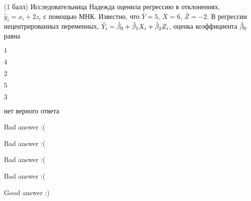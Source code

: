 
\begin{question}
(1 балл) Исследовательница Надежда оценила регрессию в отклонениях,
\(\hat y_i = x_i + 2 z_i\) с помощью МНК. Известно, что \(\bar Y=5\),
\(\bar X =6\), \(\bar Z=-2\). В регрессии нецентрированных переменных,
\(\hat Y_i = \hat{\beta}_0 + \hat{\beta}_1 X_i + \hat{\beta}_2 Z_i\), оценка коэффициента
\(\hat{\beta}_0\) равна
\begin{answerlist}
  \item \(1\)
  \item \(4\)
  \item \(2\)
  \item \(5\)
  \item \(3\)
  \item нет верного ответа
\end{answerlist}
\end{question}

\begin{solution}
\begin{answerlist}
  \item Bad answer :(
  \item Bad answer :(
  \item Bad answer :(
  \item Bad answer :(
  \item Good answer :)
\end{answerlist}
\end{solution}
